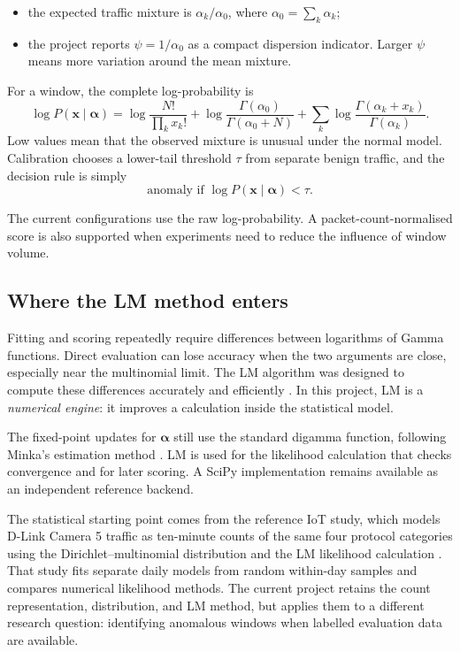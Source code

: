 \documentclass[11pt,a4paper]{article}
\begin{document}
\begin{itemize}
  \item the expected traffic mixture is $\alpha_k/\alpha_0$, where $\alpha_0=\sum_k\alpha_k$;
  \item the project reports $\psi=1/\alpha_0$ as a compact dispersion indicator. Larger $\psi$ means more variation around the mean mixture.
\end{itemize}

For a window, the complete log-probability is
\[
\log P(\mathbf{x}\mid\boldsymbol{\alpha})
=\log\frac{N!}{\prod_k x_k!}
+\log\frac{\Gamma(\alpha_0)}{\Gamma(\alpha_0+N)}
+\sum_k\log\frac{\Gamma(\alpha_k+x_k)}{\Gamma(\alpha_k)}.
\]
Low values mean that the observed mixture is unusual under the normal model. Calibration chooses a lower-tail threshold $\tau$ from separate benign traffic, and the decision rule is simply
\[
\text{anomaly if }\log P(\mathbf{x}\mid\boldsymbol{\alpha})<\tau.
\]

The current configurations use the raw log-probability. A packet-count-normalised score is also supported when experiments need to reduce the influence of window volume.

\subsection{Where the LM method enters}

Fitting and scoring repeatedly require differences between logarithms of Gamma functions. Direct evaluation can lose accuracy when the two arguments are close, especially near the multinomial limit. The LM algorithm was designed to compute these differences accurately and efficiently \cite{lmcore,tpami}. In this project, LM is a \emph{numerical engine}: it improves a calculation inside the statistical model.

The fixed-point updates for $\boldsymbol{\alpha}$ still use the standard digamma function, following Minka's estimation method \cite{minka}. LM is used for the likelihood calculation that checks convergence and for later scoring. A SciPy implementation remains available as an independent reference backend.

The statistical starting point comes from the reference IoT study, which models D-Link Camera 5 traffic as ten-minute counts of the same four protocol categories using the Dirichlet--multinomial distribution and the LM likelihood calculation \cite{iotpaper}. That study fits separate daily models from random within-day samples and compares numerical likelihood methods. The current project retains the count representation, distribution, and LM method, but applies them to a different research question: identifying anomalous windows when labelled evaluation data are available.
\end{document}

